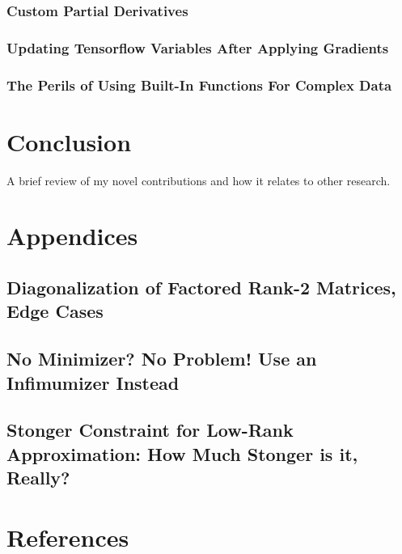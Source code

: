 \documentclass{article}
\begin{document}
\subsubsection{Custom Partial Derivatives}
\subsubsection{Updating Tensorflow Variables After Applying Gradients}
\subsubsection{The Perils of Using Built-In Functions For Complex Data}

\section{Conclusion}
A brief review of my novel contributions and how it relates to other research.

\section{Appendices}
\subsection{Diagonalization of Factored Rank-2 Matrices, Edge Cases}
\subsection{No Minimizer? No Problem! Use an Infimumizer Instead}
\subsection{Stonger Constraint for Low-Rank Approximation: How Much Stonger is it, Really?}

\section{References}
\end{document}
